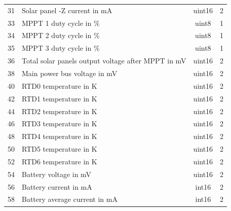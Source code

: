 \begin{table}[!ht]
\begin{tabular}{clcc}
		31                  & Solar panel -Z current in mA                      & uint16             & 2                     \\
		33                  & MPPT 1 duty cycle in \%                           & uint8              & 1                     \\
		34                  & MPPT 2 duty cycle in \%                           & uint8              & 1                     \\
		35                  & MPPT 3 duty cycle in \%                           & uint8              & 1                     \\
		36                  & Total solar panels output voltage after MPPT in mV& uint16             & 2                     \\
		38                  & Main power bus voltage in mV                      & uint16             & 2                     \\
		40                  & RTD0 temperature in K                             & uint16             & 2                     \\   
		42                  & RTD1 temperature in K                             & uint16             & 2                     \\   
		44                  & RTD2 temperature in K                             & uint16             & 2                     \\   
		46                  & RTD3 temperature in K                             & uint16             & 2                     \\   
		48                  & RTD4 temperature in K                             & uint16             & 2                     \\   
		50                  & RTD5 temperature in K                             & uint16             & 2                     \\   
		52                  & RTD6 temperature in K                             & uint16             & 2                     \\   
		54                  & Battery voltage in mV                             & uint16             & 2                     \\   
		56                  & Battery current in mA                             & int16              & 2                     \\   
		58                  & Battery average current in mA                     & int16              & 2                     \\   

\end{tabular}
\end{table}
